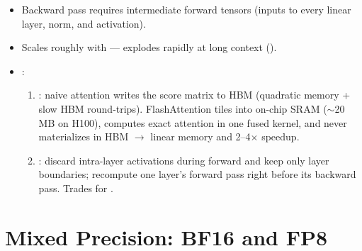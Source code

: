 \begin{itemize}
    \item Backward pass requires intermediate forward tensors (inputs to every linear layer, norm, and activation).
    \item Scales roughly with  --- explodes rapidly at long context ().
    \item {}:
    \begin{enumerate}
        \item {}: naive attention writes the \shape{[B, H, T, T]} score matrix to HBM (quadratic memory + slow HBM round-trips). FlashAttention tiles  into on-chip SRAM ($\sim$20 MB on H100), computes exact attention in one fused kernel, and never materializes \shape{[T, T]} in HBM $\rightarrow$ linear memory and 2--4$\times$ speedup.
        \item {}: discard intra-layer activations during forward and keep only layer boundaries; recompute one layer's forward pass right before its backward pass. Trades  for .
    \end{enumerate}
\end{itemize}

\section{Mixed Precision: BF16 and FP8}

